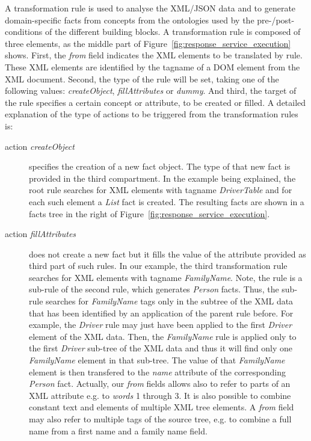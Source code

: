 \documentclass{fast_latex}
\begin{document}
{A transformation rule is used to analyse the XML/JSON data and to generate domain-specific facts from concepts from the ontologies used by the pre-/post-conditions of the different building blocks. A transformation rule is composed of three elements, as the middle part of Figure~\ref{fig:response_service_execution} shows. First, the \textit{from} field indicates the XML elements to be translated by rule. These XML elements are identified by the tagname of a DOM element from the XML document. Second, the type of the rule will be set, taking one of the following values: \emph{createObject}, \emph{fillAttributes} or \emph{dummy}. And third, the target of the rule specifies a certain concept or attribute, to be created or filled. A detailed explanation of the type of actions to be triggered from the transformation rules is:
\begin{description}
	\item[action \emph{createObject}] specifies the creation of a new fact object. The type of that new fact is provided in the third compartment. In the example being explained, the root rule searches for XML elements with tagname \emph{DriverTable} and for each such element a \emph{List} fact is created. The resulting facts are shown in a facts tree in the right of Figure~\ref{fig:response_service_execution}.
	\item[action \emph{fillAttributes}] does not create a new fact but it fills the value of the attribute provided as third part of such rules. In our example, the third transformation rule searches for XML elements with tagname \emph{FamilyName}. Note, the rule is a sub-rule of the second rule, which generates \emph{Person} facts. Thus, the sub-rule searches for \emph{FamilyName} tags only in the subtree of the XML data that has been identified by an application of the parent rule before. For example, the \emph{Driver} rule may just have been applied to the first \emph{Driver} element of the XML data. Then, the \emph{FamilyName} rule is applied only to the first \emph{Driver} sub-tree of the XML data and thus it will find only one \emph{FamilyName} element in that sub-tree. The value of that \emph{FamilyName} element is then transfered to the \emph{name} attribute of the corresponding \emph{Person} fact. Actually, our \textit{from} fields allows also to refer to parts of an XML attribute e.g. to \textit{words} 1 through 3. It is also possible to combine constant text and elements of multiple XML tree elements. A \textit{from} field may also refer to multiple tags of the source tree, e.g. to combine a full name from a first name and a family name field.  

\end{description}}
\end{document}
